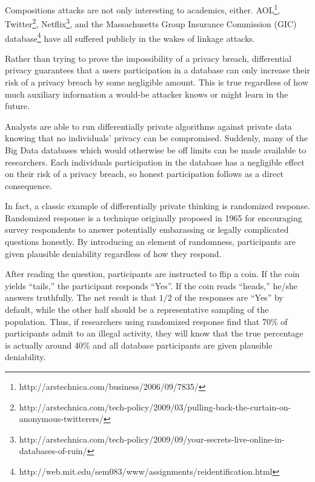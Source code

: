 \documentclass[12pt]{report}
\begin{document}
Compositions attacks are not only interesting to academics, either.
AOL\footnote{\label{fn:aol} http://arstechnica.com/business/2006/09/7835/}, Twitter\footnote{\label{fn:twitter}http://arstechnica.com/tech-policy/2009/03/pulling-back-the-curtain-on-anonymous-twitterers/}, Netflix\footnote{\label{fn:netflix}http://arstechnica.com/tech-policy/2009/09/your-secrets-live-online-in-databases-of-ruin/}, and the Massachusetts Group Insurance Commission (GIC) database\footnote{\label{fn:gic}http://web.mit.edu/sem083/www/assignments/reidentification.html} have all suffered publicly in the wakes of linkage attacks.

Rather than trying to prove the impossibility of a privacy breach, differential privacy guarantees that a users participation in a database can only increase their risk of a privacy breach by some negligible amount.
This is true regardless of how much auxiliary information a would-be attacker knows or might learn in the future.

Analysts are able to run differentially private algorithms against private data knowing that no individuals' privacy can be compromised.
Suddenly, many of the Big Data databases which would otherwise be off limits can be made available to researchers.
Each individuals participation in the database has a negligible effect on their risk of a privacy breach, so honest participation follows as a direct consequence.

In fact, a classic example of differentially private thinking is randomized response.
Randomized response is a technique originally proposed in 1965 for encouraging survey respondents to answer potentially embarassing or legally complicated questions honestly\cite{warner1965randomized}.
By introducing an element of randomness, participants are given plausible deniability regardless of how they respond.

After reading the question, participants are instructed to flip a coin.
If the coin yields ``tails,'' the participant responds ``Yes''.
If the coin reads ``heads,'' he/she answers truthfully.
The net result is that $1/2$ of the responses are ``Yes'' by default, while the other half should be a representative sampling of the population.
Thus, if researchers using randomized response find that 70\% of participants admit to an illegal activity, they will know that the true percentage is actually around 40\% and all database participants are given plausible deniability.
\end{document}
